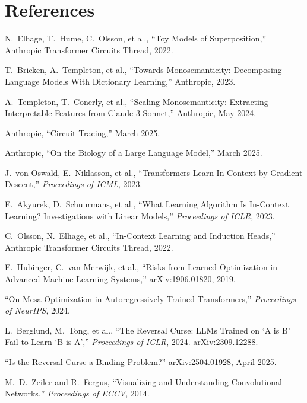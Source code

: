 \documentclass[11pt, a4paper]{article}
\theoremstyle{definition}
\theoremstyle{plain}
\begin{document}
\section*{References}

\begin{enumerate}[leftmargin=2em, label={[\arabic*]}, itemsep=4pt]
  \item N.\ Elhage, T.\ Hume, C.\ Olsson, et al., ``Toy Models of
    Superposition,'' Anthropic Transformer Circuits Thread, 2022.

  \item T.\ Bricken, A.\ Templeton, et al., ``Towards Monosemanticity:
    Decomposing Language Models With Dictionary Learning,'' Anthropic,
    2023.

  \item A.\ Templeton, T.\ Conerly, et al., ``Scaling Monosemanticity:
    Extracting Interpretable Features from Claude 3 Sonnet,'' Anthropic,
    May 2024.

  \item Anthropic, ``Circuit Tracing,'' March 2025.

  \item Anthropic, ``On the Biology of a Large Language Model,'' March
    2025.

  \item J.\ von Oswald, E.\ Niklasson, et al., ``Transformers Learn
    In-Context by Gradient Descent,'' \textit{Proceedings of ICML}, 2023.

  \item E.\ Akyurek, D.\ Schuurmans, et al., ``What Learning Algorithm
    Is In-Context Learning? Investigations with Linear Models,''
    \textit{Proceedings of ICLR}, 2023.

  \item C.\ Olsson, N.\ Elhage, et al., ``In-Context Learning and
    Induction Heads,'' Anthropic Transformer Circuits Thread, 2022.

  \item E.\ Hubinger, C.\ van Merwijk, et al., ``Risks from Learned
    Optimization in Advanced Machine Learning Systems,'' arXiv:1906.01820,
    2019.

  \item ``On Mesa-Optimization in Autoregressively Trained Transformers,''
    \textit{Proceedings of NeurIPS}, 2024.

  \item L.\ Berglund, M.\ Tong, et al., ``The Reversal Curse: LLMs
    Trained on `A is B' Fail to Learn `B is A','' \textit{Proceedings of
    ICLR}, 2024. arXiv:2309.12288.

  \item ``Is the Reversal Curse a Binding Problem?'' arXiv:2504.01928,
    April 2025.

  \item M.\ D.\ Zeiler and R.\ Fergus, ``Visualizing and Understanding
    Convolutional Networks,'' \textit{Proceedings of ECCV}, 2014.
\end{enumerate}
\end{document}
